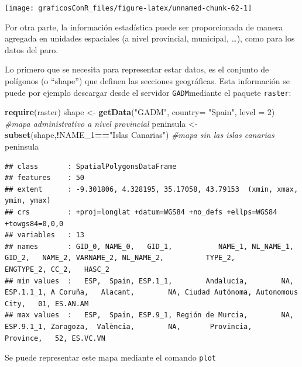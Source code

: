 \documentclass[]{article}
\newenvironment{Shaded}{\begin{snugshade}}{\end{snugshade}}
\newcommand{\CommentTok}[1]{\textcolor[rgb]{0.56,0.35,0.01}{\textit{#1}}}
\newcommand{\DataTypeTok}[1]{\textcolor[rgb]{0.13,0.29,0.53}{#1}}
\newcommand{\DecValTok}[1]{\textcolor[rgb]{0.00,0.00,0.81}{#1}}
\newcommand{\KeywordTok}[1]{\textcolor[rgb]{0.13,0.29,0.53}{\textbf{#1}}}
\newcommand{\NormalTok}[1]{#1}
\newcommand{\OperatorTok}[1]{\textcolor[rgb]{0.81,0.36,0.00}{\textbf{#1}}}
\newcommand{\StringTok}[1]{\textcolor[rgb]{0.31,0.60,0.02}{#1}}
\numberwithin{ejcnt}{section}
\begin{document}
\begin{center}\texttt{[image: graficosConR\_files/figure-latex/unnamed-chunk-62-1]} \end{center}

Por otra parte, la información estadística puede ser proporcionada de manera agregada en unidades espaciales (a nivel provincial, municipal, \ldots), como para los datos del paro.

Lo primero que se necesita para representar estar datos, es el conjunto de polígonos (o ``shape'') que definen las secciones geográficas. Esta información se puede por ejemplo descargar desde el servidor \texttt{GADM}mediante el paquete \texttt{raster}:

\begin{Shaded}
\begin{Highlighting}[]
\KeywordTok{require}\NormalTok{(raster)  }
\NormalTok{shape <-}\StringTok{ }\KeywordTok{getData}\NormalTok{(}\StringTok{"GADM"}\NormalTok{, }\DataTypeTok{country=} \StringTok{"Spain"}\NormalTok{, }\DataTypeTok{level =} \DecValTok{2}\NormalTok{) }\CommentTok{#mapa administrativo a nivel provincial}
\NormalTok{peninsula <-}\StringTok{ }\KeywordTok{subset}\NormalTok{(shape,}\OperatorTok{!}\NormalTok{NAME_}\DecValTok{1}\OperatorTok{==}\StringTok{"Islas Canarias"}\NormalTok{) }\CommentTok{#mapa sin las islas canarias}
\NormalTok{peninsula }
\end{Highlighting}
\end{Shaded}

\begin{verbatim}
## class       : SpatialPolygonsDataFrame 
## features    : 50 
## extent      : -9.301806, 4.328195, 35.17058, 43.79153  (xmin, xmax, ymin, ymax)
## crs         : +proj=longlat +datum=WGS84 +no_defs +ellps=WGS84 +towgs84=0,0,0 
## variables   : 13
## names       : GID_0, NAME_0,   GID_1,           NAME_1, NL_NAME_1,     GID_2,   NAME_2, VARNAME_2, NL_NAME_2,          TYPE_2,       ENGTYPE_2, CC_2,   HASC_2 
## min values  :   ESP,  Spain, ESP.1_1,        Andalucía,        NA, ESP.1.1_1, A Coruña,   Alacant,        NA, Ciudad Autónoma, Autonomous City,   01, ES.AN.AM 
## max values  :   ESP,  Spain, ESP.9_1, Región de Murcia,        NA, ESP.9.1_1, Zaragoza,  València,        NA,       Provincia,        Province,   52, ES.VC.VN
\end{verbatim}

Se puede representar este mapa mediante el comando \texttt{plot}

\begin{Shaded}
\end{Shaded}
\end{document}
